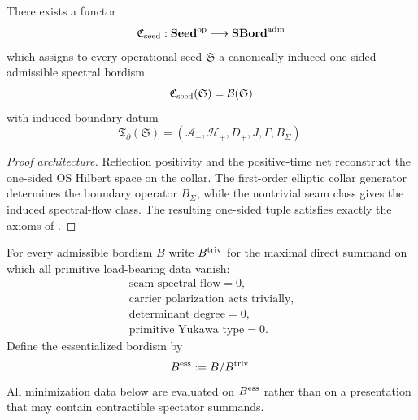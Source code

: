 \begin{theorem}
\label{thm:operational-collar-completion}
There exists a functor
\[
\mathfrak C_{\mathrm{seed}}:\mathbf{Seed}^{\mathrm{op}}\longrightarrow \mathbf{SBord}^{\mathrm{adm}}
\]
which assigns to every operational seed $\mathfrak S$ a canonically induced one-sided admissible
spectral bordism
\[
\mathfrak C_{\mathrm{seed}}(\mathfrak S)=\mathcal B(\mathfrak S)
\]
with induced boundary datum
\[
\mathfrak T_{\partial}(\mathfrak S)=(\mathcal A_+,\mathcal H_+,D_+,J,\Gamma,B_\Sigma).
\]
\end{theorem}

\begin{proof}[Proof architecture]
Reflection positivity and the positive-time net reconstruct the one-sided OS Hilbert space on the
collar. The first-order elliptic collar generator determines the boundary operator $B_\Sigma$,
while the nontrivial seam class gives the induced spectral-flow class. The resulting one-sided
tuple satisfies exactly the axioms of .
\end{proof}

\begin{definition}
For every admissible bordism $B$ write $B^{\textup{triv}}$ for the maximal direct summand on which all
primitive load-bearing data vanish:
\begin{equation}
\boxed{
\begin{gathered}
\text{seam spectral flow}=0,\\
\text{carrier polarization acts trivially},\\
\text{determinant degree}=0,\\
\text{primitive Yukawa type}=0.
\end{gathered}}
\end{equation}
Define the essentialized bordism by
\begin{equation}
B^{\textup{ess}}:=B/B^{\textup{triv}}.
\end{equation}
All minimization data below are evaluated on $B^{\textup{ess}}$ rather than on a presentation that
may contain contractible spectator summands.
\end{definition}

